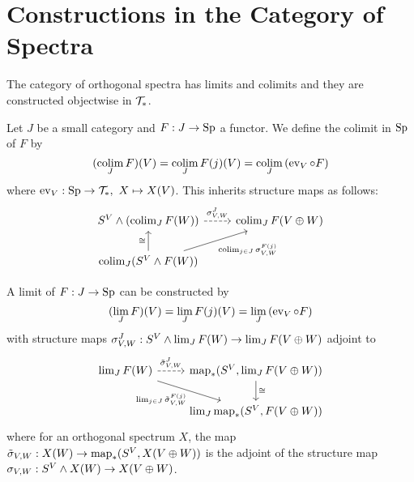 \section{Constructions in the Category of Spectra}


The category of orthogonal spectra has limits and colimits and they are constructed objectwise in $\mathcal{T}_*$.

Let $J$ be a small category and $F:J\to{\normalfont\textup{Sp}}$ a functor. We define the colimit in ${\normalfont\textup{Sp}}$ of $F$ by
\[(\operatorname*{colim}_J F)(V)=\operatorname*{colim}_J F(j)(V)=\operatorname*{colim}_J\,(\operatorname{ev}_V\circ F)\]
where $\operatorname{ev}_V:{\normalfont\textup{Sp}}\to\mathcal{T}_*,\ X\mapsto X(V)$. This inherits structure maps as follows:
\[
\begin{tikzcd}
S^V\smsh(\colim_JF(W)) \ar[r,dashed,"\sigma^J_{V,W}"] & \colim_JF(V\oplus W)\\
\colim_J(S^V\smsh F(W)) \ar[u,"\cong"] \ar[ur,"\colim_{j\in J}\sigma_{V,W}^{F(j)}"']
\end{tikzcd}
\]

A limit of $F:J\to{\normalfont\textup{Sp}}$ can be constructed by
\[(\lim_J F)(V)=\lim_J F(j)(V)=\lim_J\,(\operatorname{ev}_V\circ F)\]
with structure maps $\sigma^J_{V,W}:S^V\wedge\lim_JF(W)\to\lim_JF(V\oplus W)$ adjoint to
\[
\begin{tikzcd}
\lim_JF(W) \ar[dr,"\lim_{j\in J}\til\sigma^{F(j)}_{V,W}"'] \ar[r,dashed,"\til\sigma^J_{V,W}"] & \map_*(S^V,\lim_JF(V\oplus W)) \ar[d,"\cong"]\\
 & \lim_J\map_*(S^V,F(V\oplus W))
\end{tikzcd}
\]
where for an orthogonal spectrum $X$, the map $\tilde\sigma_{V,W}:X(W)\to\operatorname{map}_*(S^V,X(V\oplus W))$ is the adjoint of the structure map $\sigma_{V,W}:S^V\wedge X(W)\to X(V\oplus W)$.
